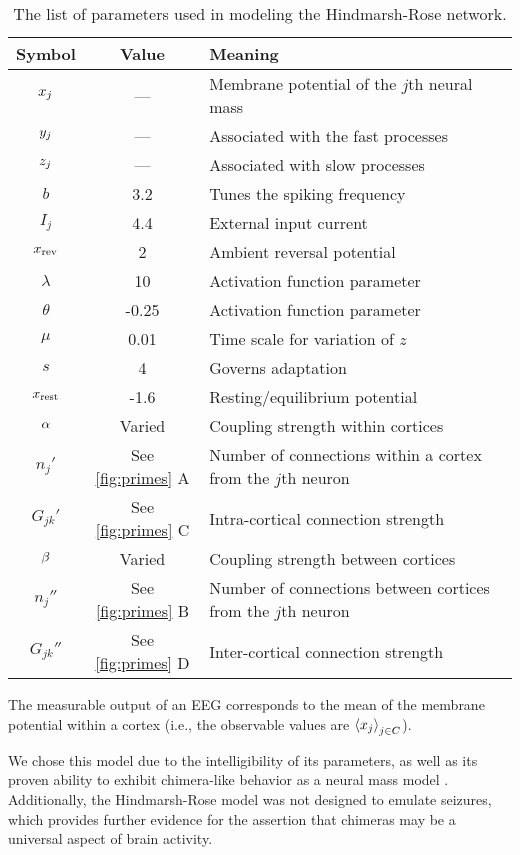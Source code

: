 \begin{table}[ht]
  \centering
  \begin{tabular}{c | c | p{}}
    Symbol & Value & Meaning \\ \hline
    $x_{j}$ & --- & Membrane potential of the $j$th neural mass \\
    $y_{j}$ & --- & Associated with the fast processes \\
    $z_{j}$ & --- & Associated with slow processes \\ \hline
    $b$ & 3.2 & Tunes the spiking frequency \\
    $I_{j}$ & 4.4 & External input current \\
    $x_{\text{rev}}$ & 2 & Ambient reversal potential \\
    $\lambda$ & 10 & Activation function parameter \\
    $\theta$ & -0.25 & Activation function parameter \\
    $\mu$ & 0.01 & Time scale for variation of $z$ \\
    $s$ & 4 & Governs adaptation \\
    $x_{\text{rest}}$ & -1.6 & Resting/equilibrium potential \\ \hline
    $\alpha$ & Varied & Coupling strength within cortices \\
    $n_{j}'$ & See \cref{fig:primes} A & Number of connections within a cortex from the $j$th neuron \\
    $G_{j k}'$ & See \cref{fig:primes} C & Intra-cortical connection strength \\
    $\beta$ & Varied & Coupling strength between cortices \\
    $n_{j}''$ & See \cref{fig:primes} B & Number of connections between cortices from the $j$th neuron \\
    $G_{j k}''$ & See \cref{fig:primes} D & Inter-cortical connection strength
  \end{tabular}
  \caption[Hindmarsh-Rose Parameters]{The list of parameters used in modeling the Hindmarsh-Rose network.}
  \label{tab:hr_params}
\end{table}

The measurable output of an EEG corresponds to the mean of the membrane potential within a cortex
(i.e., the observable values are $\expval{x_{j}}_{j \in C}$).

We chose this model due to the intelligibility of its parameters, as well as its proven ability to exhibit chimera-like behavior as a neural mass model \cite{Santos2017}.
Additionally, the Hindmarsh-Rose model was not designed to emulate seizures, which provides further evidence for the assertion that chimeras may be a universal aspect of brain activity.

